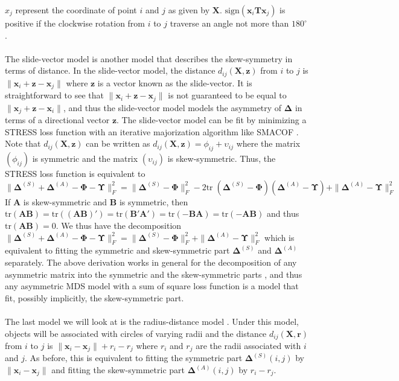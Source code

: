 $x_j$ represent the coordinate of point $i$ and $j$ as given by
$\mathbf{X}$. $\mathrm{sign}(\mathbf{x}_i \mathbf{T}
\mathbf{x}_j)$ is positive if the clockwise rotation from $i$ to $j$
traverse an angle not more than $180^\circ$. \\ \\
%
\noindent The slide-vector model is another model that describes the
skew-symmetry in terms of distance. In the slide-vector model, the
distance $d_{ij}(\mathbf{X}, \mathbf{z})$ from $i$ to $j$ is 
$\| \mathbf{x}_i + \mathbf{z} - \mathbf{x}_j \|$ where $\mathbf{z}$
is a vector known as the slide-vector. It is straightforward to see that
$\| \mathbf{x}_i + \mathbf{z} - \mathbf{x}_j \|$ is not guaranteed to
be equal to $\| \mathbf{x}_j + \mathbf{z} - \mathbf{x}_i\|$, and thus
the slide-vector model models the asymmetry of $\bm{\Delta}$ in terms
of a directional vector $\mathbf{z}$. The slide-vector model can be
fit by minimizing a STRESS loss function with an iterative
majorization algorithm like
SMACOF \citep{zielmand93:_analy}. Note that $d_{ij}(\mathbf{X},
\mathbf{z})$ can be written as $d_{ij}(\mathbf{X}, \mathbf{z}) =
\phi_{ij} + \upsilon_{ij}$ where the matrix $(\phi_{ij})$ is symmetric and
the matrix $(\upsilon_{ij})$ is skew-symmetric. Thus, the STRESS loss
function is equivalent to 
\begin{equation*}
\| \bm{\Delta}^{(S)} + \bm{\Delta}^{(A)} -
\bm{\Phi} - \bm{\Upsilon} \|^2_{F} = \| \bm{\Delta}^{(S)} -
\bm{\Phi}\|_{F}^{2} - 2 \mathrm{tr} \; (\bm{\Delta}^{(S)} - \bm{\Phi})
(\bm{\Delta}^{(A)} - \bm{\Upsilon}) + \| \bm{\Delta}^{(A)} -
\bm{\Upsilon} \|_{F}^{2}
\end{equation*}
If $\mathbf{A}$ is skew-symmetric and
$\mathbf{B}$ is symmetric, then $\mathrm{tr}(\mathbf{A}\mathbf{B}) =
\mathrm{tr}((\mathbf{A}\mathbf{B})') = \mathrm{tr}(\mathbf{B}'
\mathbf{A}') = \mathrm{tr}(- \mathbf{B} \mathbf{A}) = \mathrm{tr}(-
\mathbf{A} \mathbf{B})$ and thus $\mathrm{tr}(\mathbf{A}\mathbf{B}) =
0$. We thus have the decomposition $\| \bm{\Delta}^{(S)} + \bm{\Delta}^{(A)} -
\bm{\Phi} - \bm{\Upsilon} \|^2_{F} =  \| \bm{\Delta}^{(S)} -
\bm{\Phi}\|_{F}^{2} + \| \bm{\Delta}^{(A)} -
\bm{\Upsilon} \|_{F}^{2}$ which is equivalent to fitting the symmetric
and skew-symmetric part $\bm{\Delta}^{(S)}$ and $\bm{\Delta}^{(A)}$
separately. The above derivation works in general for the
decomposition of any asymmetric matrix into the symmetric and the
skew-symmetric parts
\citep{bove91:_metric}, and thus any asymmetric MDS model with a sum of
square loss function is a
model that fit, possibly implicitly, the skew-symmetric part.   
\\ \\ 
%
\noindent
The last model we will look at is the radius-distance model
\citep{okada87:_geomet}. Under this model, objects will be associated
with circles of varying radii and the distance $d_{ij}(\mathbf{X},
\mathbf{r})$ from $i$ to $j$ is $\|\mathbf{x}_i - \mathbf{x}_j\| + r_i
- r_j$ where $r_i$ and $r_j$ are the radii associated with $i$ and
$j$. As before, this is equivalent to fitting the symmetric part
$\bm{\Delta}^{(S)}(i,j)$ by $\|\mathbf{x}_i - \mathbf{x}_j\|$ and
fitting the skew-symmetric part $\bm{\Delta}^{(A)}(i,j)$ by $r_i - r_j$.  

